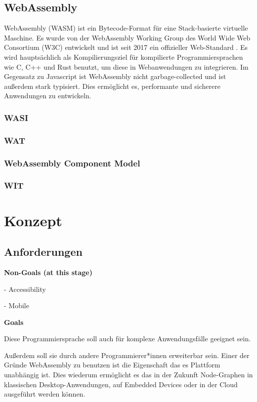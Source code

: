 \documentclass[ngerman]{article}
\begin{document}
\subsection{WebAssembly}
WebAssembly (WASM) ist ein Bytecode-Format für eine Stack-basierte virtuelle Maschine. Es wurde von der WebAssembly Working Group des World Wide Web Consortium (W3C) entwickelt und ist seit 2017 ein offizieller Web-Standard \cite{Haas2017}. 
\linebreak
\linebreak
Es wird hauptsächlich als Kompilierungsziel für kompilierte Programmiersprachen wie C, C++ und Rust benutzt, um diese in Webanwendungen zu integrieren. Im Gegensatz zu Javascript ist WebAssembly nicht garbage-collected und ist außerdem stark typisiert. Dies ermöglicht es, performante und sicherere Anwendungen zu entwickeln.
\subsubsection{WASI}
\subsubsection{WAT}
\subsubsection{WebAssembly Component Model}
\subsubsection{WIT}

\section{Konzept}

\subsection{Anforderungen}

\textbf{Non-Goals (at this stage)}

- Accessibility

- Mobile

\textbf{Goals}

Diese Programmiersprache soll auch für komplexe Anwendungsfälle geeignet sein.

Außerdem soll sie durch andere Programmierer*innen erweiterbar sein. 
Einer der Gründe WebAssembly zu benutzen ist die Eigenschaft das es Plattform unabhängig ist. Dies wiederum ermöglicht es das in der Zukunft Node-Graphen in klassischen Desktop-Anwendungen, auf Embedded Devices oder in der Cloud ausgeführt werden können.
\end{document}

